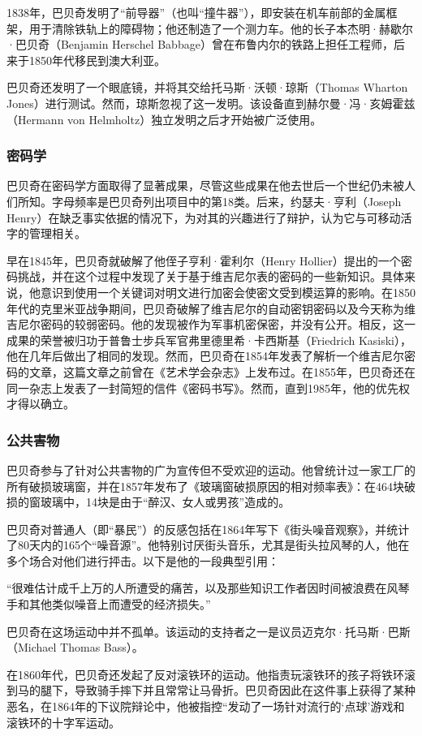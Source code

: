 1838年，巴贝奇发明了“前导器”（也叫“撞牛器”），即安装在机车前部的金属框架，用于清除铁轨上的障碍物；他还制造了一个测力车。他的长子本杰明·赫歇尔·巴贝奇（Benjamin Herschel Babbage）曾在布鲁内尔的铁路上担任工程师，后来于1850年代移民到澳大利亚。

巴贝奇还发明了一个眼底镜，并将其交给托马斯·沃顿·琼斯（Thomas Wharton Jones）进行测试。然而，琼斯忽视了这一发明。该设备直到赫尔曼·冯·亥姆霍兹（Hermann von Helmholtz）独立发明之后才开始被广泛使用。
\subsubsection{密码学}
巴贝奇在密码学方面取得了显著成果，尽管这些成果在他去世后一个世纪仍未被人们所知。字母频率是巴贝奇列出项目中的第18类。后来，约瑟夫·亨利（Joseph Henry）在缺乏事实依据的情况下，为对其的兴趣进行了辩护，认为它与可移动活字的管理相关。

早在1845年，巴贝奇就破解了他侄子亨利·霍利尔（Henry Hollier）提出的一个密码挑战，并在这个过程中发现了关于基于维吉尼尔表的密码的一些新知识。具体来说，他意识到使用一个关键词对明文进行加密会使密文受到模运算的影响。在1850年代的克里米亚战争期间，巴贝奇破解了维吉尼尔的自动密钥密码以及今天称为维吉尼尔密码的较弱密码。他的发现被作为军事机密保密，并没有公开。相反，这一成果的荣誉被归功于普鲁士步兵军官弗里德里希·卡西斯基（Friedrich Kasiski），他在几年后做出了相同的发现。然而，巴贝奇在1854年发表了解析一个维吉尼尔密码的文章，这篇文章之前曾在《艺术学会杂志》上发布过。在1855年，巴贝奇还在同一杂志上发表了一封简短的信件《密码书写》。然而，直到1985年，他的优先权才得以确立。
\subsubsection{公共害物}
巴贝奇参与了针对公共害物的广为宣传但不受欢迎的运动。他曾统计过一家工厂的所有破损玻璃窗，并在1857年发布了《玻璃窗破损原因的相对频率表》：在464块破损的窗玻璃中，14块是由于“醉汉、女人或男孩”造成的。

巴贝奇对普通人（即“暴民”）的反感包括在1864年写下《街头噪音观察》，并统计了80天内的165个“噪音源”。他特别讨厌街头音乐，尤其是街头拉风琴的人，他在多个场合对他们进行抨击。以下是他的一段典型引用：

“很难估计成千上万的人所遭受的痛苦，以及那些知识工作者因时间被浪费在风琴手和其他类似噪音上而遭受的经济损失。”

巴贝奇在这场运动中并不孤单。该运动的支持者之一是议员迈克尔·托马斯·巴斯（Michael Thomas Bass）。

在1860年代，巴贝奇还发起了反对滚铁环的运动。他指责玩滚铁环的孩子将铁环滚到马的腿下，导致骑手摔下并且常常让马骨折。巴贝奇因此在这件事上获得了某种恶名，在1864年的下议院辩论中，他被指控“发动了一场针对流行的‘点球’游戏和滚铁环的十字军运动。
